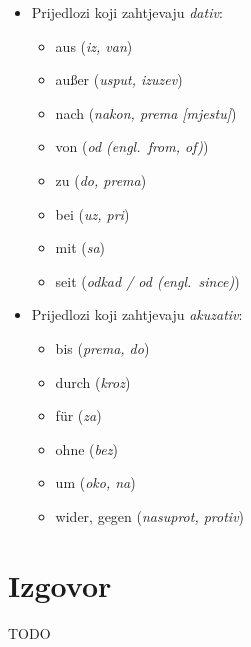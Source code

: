 \documentclass[12pt,german]{article}
\newcommand{\prijevod}[2]{\item #1 (\emph{#2})}
\begin{document}
\begin{multicols}{2}
\begin{itemize}
  \item Prijedlozi koji zahtjevaju \emph{dativ}:
  \begin{itemize}[nolistsep, label={}]
      \prijevod{aus}{iz, van}
      \prijevod{au{\ss}er}{usput, izuzev}
      \prijevod{nach}{nakon, prema [mjestu]}
      \prijevod{von}{od (engl.\ \emph{from, of})}
      \prijevod{zu}{do, prema}
      \prijevod{bei}{uz, pri}
      \prijevod{mit}{sa}
      \prijevod{seit}{odkad / od (engl.\ \emph{since})}
  \end{itemize}

  \item Prijedlozi koji zahtjevaju \emph{akuzativ}:
  \begin{itemize}[nolistsep, label={}]
      \prijevod{bis}{prema, do}
      \prijevod{durch}{kroz}
      \prijevod{f\"ur}{za}
      \prijevod{ohne}{bez}
      \prijevod{um}{oko, na}
      \prijevod{wider, gegen}{nasuprot, protiv}
  \end{itemize}
\end{itemize}

\section{Izgovor}
TODO
% 

\end{multicols}
\end{document}
